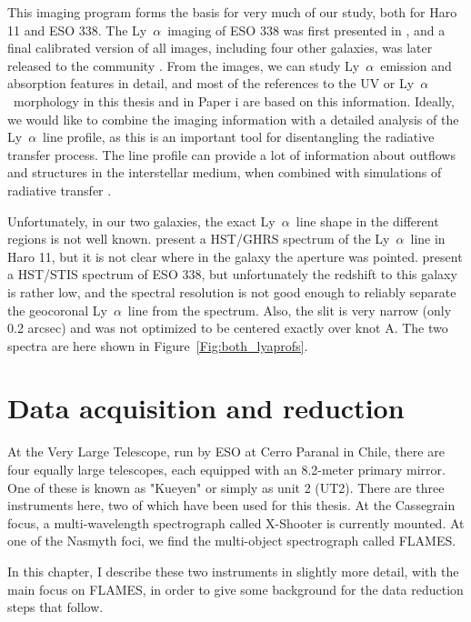 \documentclass[a4wide,12pt]{book}
\newcommand{\lya}{Ly~${\alpha}$}
\begin{document}
{This imaging program forms the basis for very much of our study, both for Haro 11 and ESO 338. The \lya\ imaging of ESO 338 was first presented in \citet{hayes-2005}, and a final calibrated version of all images, including four other galaxies, was later released to the community \citep{ostlin-2009}. From the images, we can study \lya\ emission and absorption features in detail, and most of the references to the UV or \lya\ morphology in this thesis and in Paper {\sc i} are based on this information. Ideally, we would like to combine the imaging information with a detailed analysis of the \lya\ line profile, as this is an important tool for disentangling the radiative transfer process. The line profile can provide a lot of information about outflows and structures in the interstellar medium, when combined with simulations of radiative transfer \citep[see e.g.][]{verhamme-2008,noterdaeme-2012}.

Unfortunately, in our two galaxies, the exact \lya\ line shape in the different regions is not well known. \citet{kunth-1998} present a HST/GHRS spectrum of the \lya\ line in Haro 11, but it is not clear where in the galaxy the aperture was pointed. \citet{hayes-2005} present a HST/STIS spectrum of ESO 338, but unfortunately the redshift to this galaxy is rather low, and the spectral resolution is not good enough to reliably separate the geocoronal \lya\ line from the spectrum. Also, the slit is very narrow (only 0.2 arcsec) and was not optimized to be centered exactly over knot A. The two spectra are here shown in Figure~\ref{Fig:both_lyaprofs}.


\chapter{Data acquisition and reduction}

At the Very Large Telescope, run by ESO at Cerro Paranal in Chile, there are four equally large telescopes, each equipped with an 8.2-meter primary mirror. One of these is known as "Kueyen" or simply as unit 2 (UT2). There are three instruments here, two of which have been used for this thesis. At the Cassegrain focus, a multi-wavelength spectrograph called X-Shooter is currently mounted. At one of the Nasmyth foci, we find the multi-object spectrograph called FLAMES. 

In this chapter, I describe these two instruments in slightly more detail, with the main focus on FLAMES, in order to give some background for the data reduction steps that follow. 

}
\end{document}
